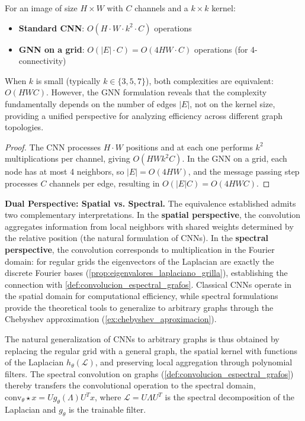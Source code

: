 \begin{proposition}\label{prop:complejidad_cnn_vs_gnn_grilla}
For an image of size $H \times W$ with $C$ channels and a $k \times k$ kernel:
\begin{itemize}
    \item \textbf{Standard CNN}: $O(H \cdot W \cdot k^2 \cdot C)$ operations
    \item \textbf{GNN on a grid}: $O(|E| \cdot C) = O(4HW \cdot C)$ operations (for 4-connectivity)
\end{itemize}
When $k$ is small (typically $k \in \{3, 5, 7\}$), both complexities are equivalent: $O(HWC)$. However, the GNN formulation reveals that the complexity fundamentally depends on the number of edges $|E|$, not on the kernel size, providing a unified perspective for analyzing efficiency across different graph topologies.
\end{proposition}

\begin{proof}
The CNN processes $H \cdot W$ positions and at each one performs $k^2$ multiplications per channel, giving $O(H W k^2 C)$. In the GNN on a grid, each node has at most 4 neighbors, so $|E| = O(4HW)$, and the message passing step processes $C$ channels per edge, resulting in $O(|E| C) = O(4HW C)$.
\end{proof}

\textbf{Dual Perspective: Spatial vs. Spectral.} The equivalence established admits two complementary interpretations. In the \textbf{spatial perspective}, the convolution aggregates information from local neighbors with shared weights determined by the relative position (the natural formulation of CNNs). In the \textbf{spectral perspective}, the convolution corresponds to multiplication in the Fourier domain: for regular grids the eigenvectors of the Laplacian are exactly the discrete Fourier bases (\autoref{prop:eigenvalores_laplaciano_grilla}), establishing the connection with \autoref{def:convolucion_espectral_grafos}. Classical CNNs operate in the spatial domain for computational efficiency, while spectral formulations provide the theoretical tools to generalize to arbitrary graphs through the Chebyshev approximation (\autoref{ex:chebyshev_aproximacion}).

The natural generalization of CNNs to arbitrary graphs is thus obtained by replacing the regular grid with a general graph, the spatial kernel with functions of the Laplacian $h_\theta(\mathcal{L})$, and preserving local aggregation through polynomial filters. The spectral convolution on graphs (\autoref{def:convolucion_espectral_grafos}) thereby transfers the convolutional operation to the spectral domain, $\text{conv}_\theta \star x = U g_\theta(\Lambda) U^T x$, where $\mathcal{L} = U\Lambda U^T$ is the spectral decomposition of the Laplacian and $g_\theta$ is the trainable filter.

